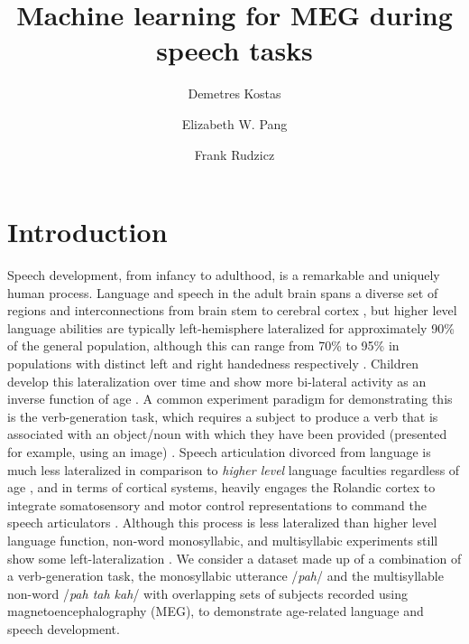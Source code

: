 \documentclass[fleqn,10pt]{wlscirep}
\title{Machine learning for MEG during speech tasks}
\author[1,*]{Demetres Kostas}
\author[2]{Elizabeth W. Pang}
\author[1,3]{Frank Rudzicz}
\affil[1]{University of Toronto; Canada}
\affil[2]{SickKids Research Institutue; Toronto, Canada}
\affil[3]{Toronto Rehabilitation Institute-UHN; Canada}
\affil[*]{demetres@cs.toronto.edu}
\begin{document}
\flushbottom
\maketitle

\thispagestyle{empty}

\section*{Introduction}

Speech development, from infancy to adulthood, is a remarkable and uniquely human process. Language and speech in the adult brain spans a diverse set of regions and interconnections from brain stem to cerebral cortex \cite{GuentherBook, Tourville2011, Hillis}, but higher level language abilities are typically left-hemisphere lateralized for approximately 90\% of the general population, although this  can range from 70\% to 95\% in populations with distinct left and right handedness respectively \cite{GuentherBook, Kadis2011, Yu2014}. Children develop this lateralization over time and show more bi-lateral activity as an inverse function of age \cite{Kadis2011, Ressel2008}. A common experiment paradigm for demonstrating this is the verb-generation task, which requires a subject to produce a verb that is associated with an object/noun with which they have been provided (presented for example, using an image) \cite{Kadis2011}. Speech articulation divorced from language is much less lateralized in comparison to {\em higher level} language faculties regardless of age \cite{GuentherBook}, and in terms of cortical systems, heavily engages the Rolandic cortex to integrate somatosensory and motor control representations to command the speech articulators \cite{GuentherBook}. Although this process is less lateralized than higher level language function, non-word monosyllabic, and multisyllabic experiments still show some left-lateralization \cite{Ghosh2008a}. We consider a dataset made up of a combination of a verb-generation task, the monosyllabic utterance /{\em pah}/ and the multisyllable non-word /{\em pah tah kah}/ with overlapping sets of subjects recorded using magnetoencephalography (MEG), to demonstrate age-related language and speech development. %
\end{document}
